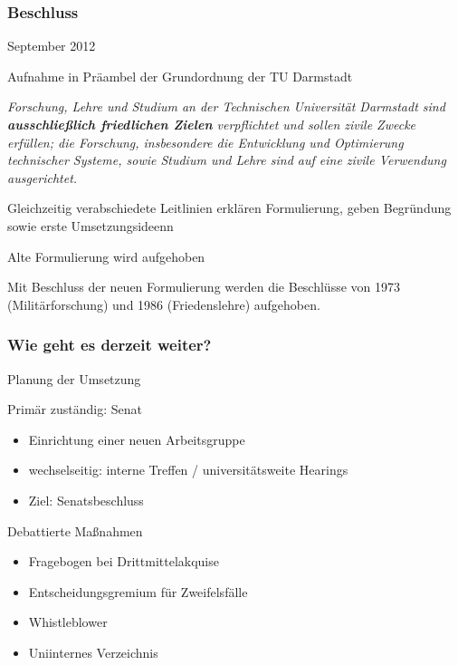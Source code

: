 \documentclass[presentation]{beamer}
\providecommand{\alert}[1]{\textbf{#1}}
\begin{document}
\begin{frame}
\frametitle{Beschluss}
\label{sec-2-3}

September 2012
\begin{block}{Aufnahme in Präambel der Grundordnung der TU Darmstadt}
\label{sec-2-3-1}

\small\emph{Forschung, Lehre und Studium an der Technischen Universität Darmstadt sind \alert{ausschließlich friedlichen Zielen} verpflichtet und sollen zivile Zwecke erfüllen; die Forschung, insbesondere die Entwicklung und Optimierung technischer Systeme, sowie Studium und Lehre sind auf eine zivile Verwendung ausgerichtet.}
\end{block}
\label{sec-2-3-2}

    Gleichzeitig verabschiedete Leitlinien erklären Formulierung, geben Begründung sowie erste Umsetzungsideenn
\begin{alertblock}{Alte Formulierung wird aufgehoben}
\label{sec-2-3-3}

    \small Mit Beschluss der neuen Formulierung werden die Beschlüsse von 1973 (Militärforschung) und 1986 (Friedenslehre) aufgehoben.
    
\end{alertblock}
\end{frame}
\begin{frame}
\frametitle{Wie geht es derzeit weiter?}
\label{sec-2-4}
\begin{block}{Planung der Umsetzung}
\label{sec-2-4-1}

    Primär zuständig: Senat
\begin{itemize}
\item Einrichtung einer neuen Arbeitsgruppe
\item wechselseitig: interne Treffen / universitätsweite Hearings
\item Ziel: Senatsbeschluss
\end{itemize}
\end{block}
\begin{block}{Debattierte Maßnahmen}
\label{sec-2-4-2}

\begin{itemize}
\item Fragebogen bei Drittmittelakquise
\item Entscheidungsgremium für Zweifelsfälle
\item Whistleblower
\item Uniinternes Verzeichnis
\end{itemize}
\end{block}
\end{frame}
\end{document}
